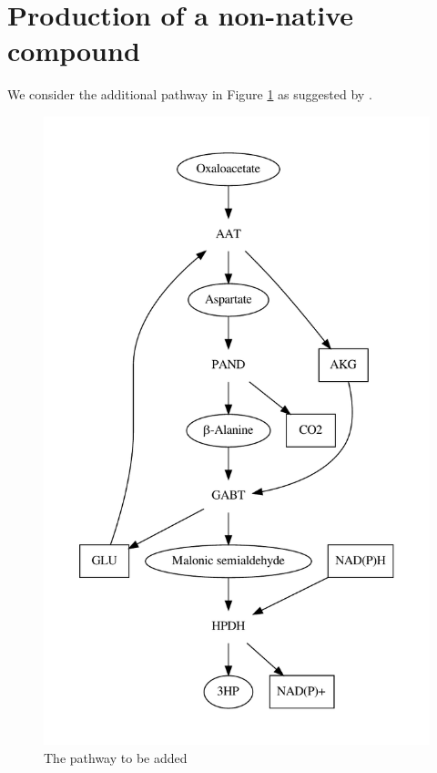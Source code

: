\documentclass{scrartcl}
\begin{document}
      
   \FloatBarrier
      
\section{Production of a non-native compound}
	We consider the additional pathway in Figure \ref{fig:pathway} as suggested by \cite{BORODINA201557}.
	\begin{figure}[h]
		\centering
		\includegraphics[max width=\linewidth, max height=0.5\paperheight]{2/new_pathway.pdf}
		\caption{The pathway to be added}
		\label{fig:pathway}
	\end{figure}
\end{document}
